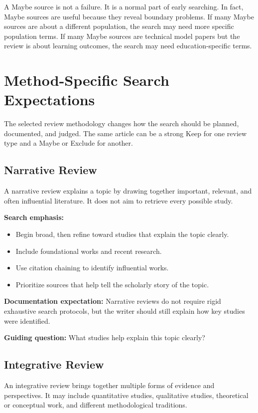 \documentclass[11pt,letterpaper]{article}
\begin{document}
A Maybe source is not a failure. It is a normal part of early searching. In fact, Maybe sources are useful because they reveal boundary problems. If many Maybe sources are about a different population, the search may need more specific population terms. If many Maybe sources are technical model papers but the review is about learning outcomes, the search may need education-specific terms.

\section{Method-Specific Search Expectations}

The selected review methodology changes how the search should be planned, documented, and judged. The same article can be a strong Keep for one review type and a Maybe or Exclude for another.

\subsection{Narrative Review}

A narrative review explains a topic by drawing together important, relevant, and often influential literature. It does not aim to retrieve every possible study.

\textbf{Search emphasis:}

\begin{itemize}
  \item Begin broad, then refine toward studies that explain the topic clearly.
  \item Include foundational works and recent research.
  \item Use citation chaining to identify influential works.
  \item Prioritize sources that help tell the scholarly story of the topic.
\end{itemize}

\textbf{Documentation expectation:} Narrative reviews do not require rigid exhaustive search protocols, but the writer should still explain how key studies were identified.

\textbf{Guiding question:} What studies help explain this topic clearly?

\subsection{Integrative Review}

An integrative review brings together multiple forms of evidence and perspectives. It may include quantitative studies, qualitative studies, theoretical or conceptual work, and different methodological traditions.
\end{document}
